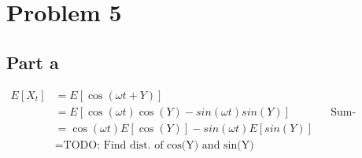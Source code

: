 \documentclass{article}
\begin{document}
\section*{Problem 5}
\subsection*{Part a}
\begin{align*}
    E[X_t] &= E[\cos(\omega t + Y)]\\
    &= E[\cos(\omega t) \cos(Y) - sin(\omega t) sin(Y)] && \text{Sum-difference for cos}\\
    &= \cos(\omega t) E[\cos(Y)] - sin(\omega t) E[sin(Y)]\\
    &= \text{TODO: Find dist. of cos(Y) and sin(Y)}
\end{align*}





\end{document}
